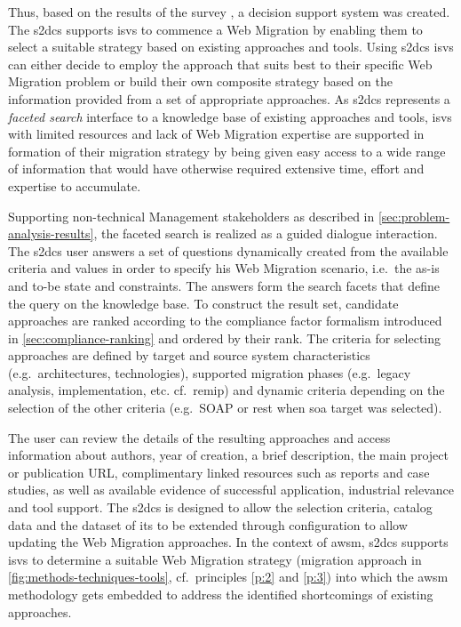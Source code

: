 Thus, based on the results of the survey \autocite{Heil2017Survey}, a decision support system was created.
The \gls{s2dcs} supports \glspl{isv} to commence a \gls{Web Migration} by enabling them to select a suitable strategy based on existing approaches and tools.
Using \gls{s2dcs} \glspl{isv} can either decide to employ the approach that suits best to their specific \gls{Web Migration} problem or build their own composite strategy based on the information provided from a set of appropriate approaches.
As \gls{s2dcs} represents a \emph{faceted search} interface \autocite{Tunkelang2009FacetedSearch} to a knowledge base of existing approaches and tools, \glspl{isv} with limited resources and lack of \gls{Web Migration} expertise are supported in formation of their migration strategy by being given easy access to a wide range of information that would have otherwise required extensive time, effort and expertise to accumulate.

Supporting non-technical Management stakeholders as described in \cref{sec:problem-analysis-results}, the faceted search is realized as a guided dialogue interaction.
The \gls{s2dcs} user answers a set of questions dynamically created from the available criteria and values in order to specify his \gls{Web Migration} scenario, i.e.~the as-is and to-be state \autocite{Nguyen2009} and constraints.
The answers form the search facets that define the query on the knowledge base.
To construct the result set, candidate approaches are ranked according to the compliance factor formalism introduced in \cref{sec:compliance-ranking} and ordered by their rank.
The criteria for selecting approaches are defined by target and source system characteristics (e.g.~architectures, technologies), supported migration phases (e.g.~legacy analysis, implementation, etc.
cf.~\gls{remip}) and dynamic criteria depending on the selection of the other criteria (e.g.~SOAP or \gls{rest} when \gls{soa} target was selected).

The user can review the details of the resulting approaches and access information about authors, year of creation, a brief description, the main project or publication URL, complimentary linked resources such as reports and case studies, as well as available evidence of successful application, industrial relevance and tool support.
The \gls{s2dcs} is designed to allow the selection criteria, catalog data and the dataset of its \knowledgebase to be extended through configuration to allow updating the \gls{Web Migration} approaches.
In the context of \gls{awsm}, \gls{s2dcs} supports \glspl{isv} to determine a suitable \gls{Web Migration} strategy (migration approach in \cref{fig:methods-techniques-tools}, cf.~principles \cref{p:2} and \cref{p:3}) into which the \gls{awsm} methodology gets embedded to address the identified shortcomings of existing approaches.

